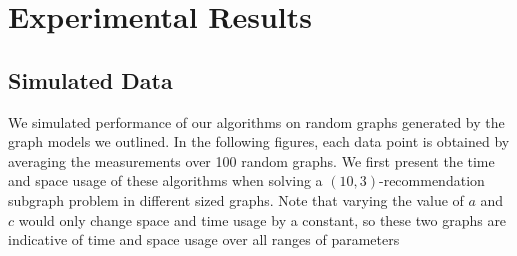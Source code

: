 \section{Experimental Results}

\subsection{Simulated Data}
We simulated performance of our algorithms on random graphs generated
by the graph models we outlined. 
In the following figures, each data
point is obtained by averaging the measurements over 100 random
graphs. We first present the time and space usage of these algorithms when
solving a $(10,3)$-recommendation subgraph problem in different sized graphs.
Note that varying the value of $a$ and $c$ would only change space and time
usage by a constant, so these two graphs are indicative of time and space
usage over all ranges of parameters

